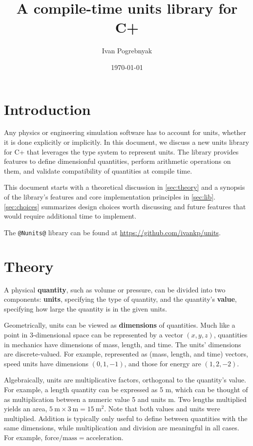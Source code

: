 \documentclass[11pt,letterpaper]{article}
\title{A compile-time units library for \texorpdfstring{C\++}{C++}}
\author{Ivan Pogrebnyak}
\date{\today}
\makeatletter
\newcommand{\lib}{\lstinline{@Nunits@} library}
\makeatother
\begin{document}
\maketitle

\tableofcontents

\section{Introduction} %

Any physics or engineering simulation software has to account for units,
whether it is done explicitly or implicitly.
In this document, we discuss a new units library for C\++ that leverages the type system to
represent units.
The library provides features to define dimensionful quantities,
perform arithmetic operations on them, and validate compatibility of quantities at compile time.

This document starts with a theoretical discussion in \autoref{sec:theory}
and a synopsis of the library's features and core implementation principles in \autoref{sec:lib}.
\autoref{sec:choices} summarizes design choices worth discussing and future features that would
require additional time to implement.

The \lib{} can be found at \url{https://github.com/ivankp/units}.

\section{Theory}\label{sec:theory} %

A physical \textbf{quantity}, such as volume or pressure, can be divided into two components:
\textbf{units}, specifying the type of quantity, and the quantity's \textbf{value}, specifying how
large the quantity is in the given units.

Geometrically, units can be viewed as \textbf{dimensions} of quantities. Much like a point
in 3-dimensional space can be represented by a vector $(x,y,z)$, quantities in mechanics have
dimensions of mass, length, and time. The units' dimensions are discrete-valued. For example,
represented as (mass, length, and time) vectors, speed units have dimensions $(0,1,-1)$, and those
for energy are $(1,2,-2)$.

Algebraically, units are multiplicative factors, orthogonal to the quantity's value.
For example, a length quantity can be expressed as 5 m, which can be thought of as multiplication
between a numeric value 5 and units m. Two lengths multiplied yields an area,
$5~\text{m} \times 3~\text{m} = 15~\text{m}^2$.
Note that both values and units were multiplied. Addition is typically only useful to define between
quantities with the same dimensions, while multiplication and division are meaningful in all cases.
For example, $\text{force} / \text{mass} = \text{acceleration}$.
\end{document}
